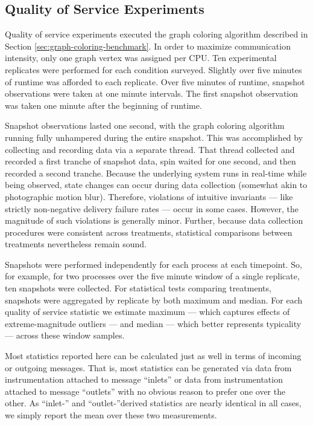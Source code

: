 \subsection{Quality of Service Experiments} \label{sec:quality-of-service-experiments}

Quality of service experiments executed the graph coloring algorithm described in Section \ref{sec:graph-coloring-benchmark}.
In order to maximize communication intensity, only one graph vertex was assigned per CPU.
Ten experimental replicates were performed for each condition surveyed.
Slightly over five minutes of runtime was afforded to each replicate.
Over five minutes of runtime, snapshot observations were taken at one minute intervals.
The first snapshot observation was taken one minute after the beginning of runtime.

Snapshot observations lasted one second, with the graph coloring algorithm running fully unhampered during the entire snapshot.
This was accomplished by collecting and recording data via a separate thread.
That thread collected and recorded a first tranche of snapshot data, spin waited for one second, and then recorded a second tranche.
Because the underlying system runs in real-time while being observed, state changes can occur during data collection (somewhat akin to photographic motion blur).
Therefore, violations of intuitive invariants --- like strictly non-negative delivery failure rates --- occur in some cases.
However, the magnitude of such violations is generally minor.
Further, because data collection procedures were consistent across treatments, statistical comparisons between treatments nevertheless remain sound.

Snapshots were performed independently for each process at each timepoint.
So, for example, for two processes over the five minute window of a single replicate, ten snapshots were collected.
For statistical tests comparing treatments, snapshots were aggregated by replicate by both maximum and median.
For each quality of service statistic we estimate maximum --- which captures effects of extreme-magnitude outliers --- and median --- which better represents typicality --- across these window samples.

Most statistics reported here can be calculated just as well in terms of incoming or outgoing messages.
That is, most statistics can be generated via data from instrumentation attached to message ``inlets'' or data from instrumentation attached to message ``outlets'' with no obvious reason to prefer one over the other.
As ``inlet-'' and ``outlet-''derived statistics are nearly identical in all cases, we simply report the mean over these two measurements.
